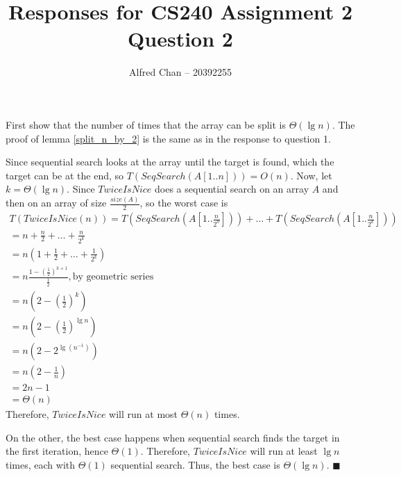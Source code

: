 \documentclass[12pt]{article}
\title{Responses for CS240 Assignment 2 Question 2}
\author{Alfred Chan -- 20392255}
\begin{document}
\maketitle
First show that the number of times that the array can be split is $\Theta(\lg n)$. The proof of lemma \ref{split_n_by_2} is the same as in the response to question 1.

Since sequential search looks at the array until the target is found, which the target can be at the end, so $T(SeqSearch(A[1..n])) = O(n)$.
Now, let $k = \Theta(\lg n)$.
Since $TwiceIsNice$ does a sequential search on an array $A$ and then on an array of size $\frac{size(A)}{2}$, so the worst case is
\begin{gather*}
T(TwiceIsNice(n)) = T(SeqSearch(A[1..\frac{n}{2^0}])) + \dots + T(SeqSearch(A[1 .. \frac{n}{2^k}]))\\
	= n + \frac{n}{2} + \dots + \frac{n}{2^k}\\
	= n (1 + \frac{1}{2} + \dots + \frac{1}{2^k})\\
	= n \frac{1 - (\frac{1}{2})^{k+1}}{\frac{1}{2}}, \text{by geometric series}\\
	= n (2 - (\frac{1}{2})^{k})\\
	= n (2 - (\frac{1}{2})^{\lg n})\\
	= n (2 - 2^{\lg (n^{-1})})\\
	= n (2 - \frac{1}{n})\\
	= 2n - 1\\
	= \Theta(n)
\end{gather*}
Therefore, $TwiceIsNice$ will run at most $\Theta(n)$ times.

On the other, the best case happens when sequential search finds the target in the first iteration, hence $\Theta(1)$.
Therefore, $TwiceIsNice$ will run at least $\lg n$ times, each with $\Theta(1)$ sequential search.
Thus, the best case is $\Theta(\lg n)$.
\hfill $\blacksquare$
\end{document}
